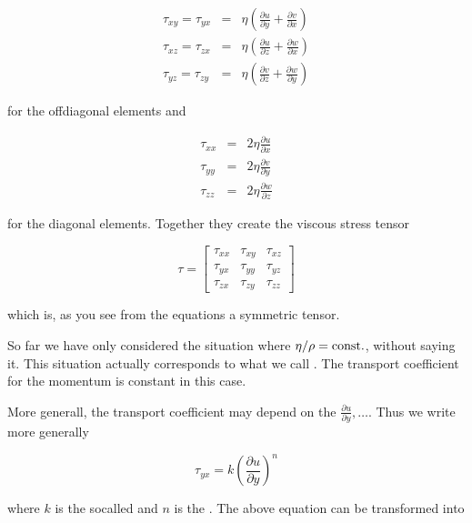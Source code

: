 \documentclass[letterpaper,10pt,english]{sphinxmanual}
\begin{document}
\sphinxAtStartPar
\begin{eqnarray}
\tau_{xy}=\tau_{yx}&=&\eta \left ( \frac{\partial u}{\partial y} +\frac{\partial v}{\partial x}\right )\\
\tau_{xz}=\tau_{zx}&=&\eta \left ( \frac{\partial u}{\partial z} +\frac{\partial w}{\partial x}\right )\\
\tau_{yz}=\tau_{zy}&=&\eta \left ( \frac{\partial v}{\partial z} +\frac{\partial w}{\partial y}\right )
\end{eqnarray}

\sphinxAtStartPar
for the off\sphinxhyphen{}diagonal elements and

\sphinxAtStartPar
\begin{eqnarray}
\tau_{xx}&=&2\eta \frac{\partial u }{\partial x}\\
\tau_{yy}&=&2\eta \frac{\partial v }{\partial y}\\
\tau_{zz}&=&2\eta \frac{\partial w }{\partial z}
\end{eqnarray}

\sphinxAtStartPar
for the diagonal elements. Together they create the viscous stress tensor

\sphinxAtStartPar
\begin{equation}
\tau=\begin{bmatrix}
\tau_{xx} & \tau_{xy} & \tau_{xz}\\
\tau_{yx} & \tau_{yy} & \tau_{yz}\\
\tau_{zx} & \tau_{zy} & \tau_{zz}
\end{bmatrix}
\end{equation}

\sphinxAtStartPar
which is, as you see from the equations a symmetric tensor.

\sphinxAtStartPar
So far we have only considered the situation where \(\eta/\rho={\rm const.}\), without saying it. This situation actually corresponds to what we call . The transport coefficient for the momentum is constant in this case.

\sphinxAtStartPar
More generall, the transport coefficient may depend on the  \(\frac{\partial u}{\partial y},\ldots\). Thus we write more generally

\sphinxAtStartPar
\begin{equation}
\tau_{yx}=k\left( \frac{\partial u}{\partial y} \right)^n
\end{equation}

\sphinxAtStartPar
where \(k\) is the so\sphinxhyphen{}called  and \(n\) is the . The above equation can be transformed into
\end{document}
